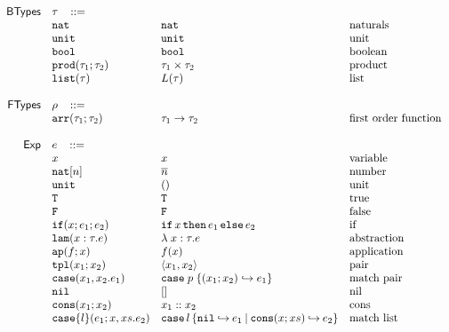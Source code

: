 \documentclass[sigconf]{acmart}
\newcommand{\ms}[1]{\ensuremath{\mathsf{#1}}}
\newcommand{\irl}[1]{\mathtt{#1}}
\newcommand{\paircaseabt}[4]{\irl{case}(#2,#3.#4)}
\newcommand{\paircasecst}[4]{\irl{case} \; #1\; \{(#2;#3) \hookrightarrow #4\}}
\theoremstyle{definition}
\begin{document}
\begin{table}
\[
\begin{array}{r l l l l}
\ms{BTypes} & \tau \,\,\,\,\, ::= \\
	& \irl{nat}                	 			& \irl{nat}											& \text{naturals}\\
	& \unittyabt                	 			& \unittycst										& \text{unit}\\
  & \booltyabt                       & \booltycst                    & \text{boolean}\\
  & \prodtyabt{\tau_1}{\tau_2}       & \prodtycst{\tau_1}{\tau_2}    & \text{product}\\
  &\listtyabt{\tau}		& L(\tau)											& \text{list}\\
  \\
\ms{FTypes} & \rho \,\,\,\,\, ::= \\
	&\irl{arr}(\tau_1;\tau_2) 				& \arrtycst{\tau_1}{\tau_2} 									& \text{first order function}\\
	 \\
\ms{Exp}
        & e   \,\,\,\,\, ::= \\
 	& x                                			& x 												& \text{variable}\\
  & \irl{nat}[n]							& \numeral{n}												& \text{number}\\
  & \irl{unit}							& ()												& \text{unit}\\
  & \irl{T}							& \irl{T}												& \text{true}\\
  & \irl{F}	   					& \irl{F}												& \text{false}\\
  & \ifexabt{x}{e_1}{e_2} & \ifexcst{x}{e_1}{e_2}  & \text{if}\\
  & \irl{lam}(x:\tau.e) 						&\lambda \; x : \tau. e 		& \text{abstraction}\\
  & \irl{ap}(f;x) 					& \appcst{f}{x} 										& \text{application}\\
  & \irl{tpl}(x_1;x_2)     	& \pairexcst{x_1}{x_2}                									& \text{pair}\\
 	& \paircaseabt{p}{x_1}{x_2}{e_1}					& \paircasecst{p}{x_1}{x_2}{e_1}   	& \text{match pair}\\
 	& \nilexabt					& []   										& \text{nil}\\
 	& \consexabt{x_1}{x_2}					& x_1::x_2   										& \text{cons}\\
 	& \listcaseexabt{l}{e_1}{x}{xs}{e_2}					& \listcaseexcst{l}{e_1}{x}{xs}{e_2}   	& \text{match list}\\

\end{array}\]
\end{table}
\end{document}
